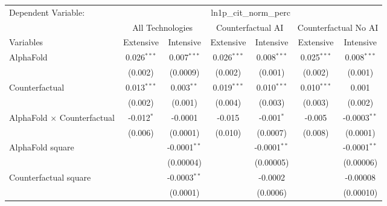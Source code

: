 \begingroup
\centering
\begin{tabular}{lcccccc}
   \tabularnewline \midrule \midrule
   Dependent Variable: & \multicolumn{6}{c}{ln1p\_cit\_norm\_perc}\\
 & \multicolumn{2}{c}{All Technologies} & \multicolumn{2}{c}{Counterfactual AI} & \multicolumn{2}{c}{Counterfactual No AI} \\
\cmidrule(lr){1-1}\cmidrule(lr){2-3} \cmidrule(lr){4-5} \cmidrule(lr){6-7}
Variables & \multicolumn{1}{c}{Extensive} & \multicolumn{1}{c}{Intensive} & \multicolumn{1}{c}{Extensive} & \multicolumn{1}{c}{Intensive} & \multicolumn{1}{c}{Extensive} & \multicolumn{1}{c}{Intensive} \\
\cmidrule(lr){1-1}\cmidrule(lr){2-2} \cmidrule(lr){3-3} \cmidrule(lr){4-4} \cmidrule(lr){5-5} \cmidrule(lr){6-6} \cmidrule(lr){7-7}
   AlphaFold                          & 0.026$^{***}$ & 0.007$^{***}$      & 0.026$^{***}$ & 0.008$^{***}$  & 0.025$^{***}$ & 0.008$^{***}$\\   
                                      & (0.002)       & (0.0009)           & (0.002)       & (0.001)        & (0.002)       & (0.001)\\   
   Counterfactual                     & 0.013$^{***}$ & 0.003$^{**}$       & 0.019$^{***}$ & 0.010$^{***}$  & 0.010$^{***}$ & 0.001\\   
                                      & (0.002)       & (0.001)            & (0.004)       & (0.003)        & (0.003)       & (0.002)\\   
   AlphaFold $\times$ Counterfactual  & -0.012$^{*}$  & -0.0001            & -0.015        & -0.001$^{*}$   & -0.005        & -0.0003$^{**}$\\   
                                      & (0.006)       & (0.0001)           & (0.010)       & (0.0007)       & (0.008)       & (0.0001)\\   
   AlphaFold square                   &               & -0.0001$^{**}$     &               & -0.0001$^{**}$ &               & -0.0001$^{**}$\\   
                                      &               & (0.00004)          &               & (0.00005)      &               & (0.00006)\\   
   Counterfactual square              &               & -0.0003$^{**}$     &               & -0.0002        &               & -0.00008\\   
                                      &               & (0.0001)           &               & (0.0006)       &               & (0.00010)\\   

\end{tabular}
